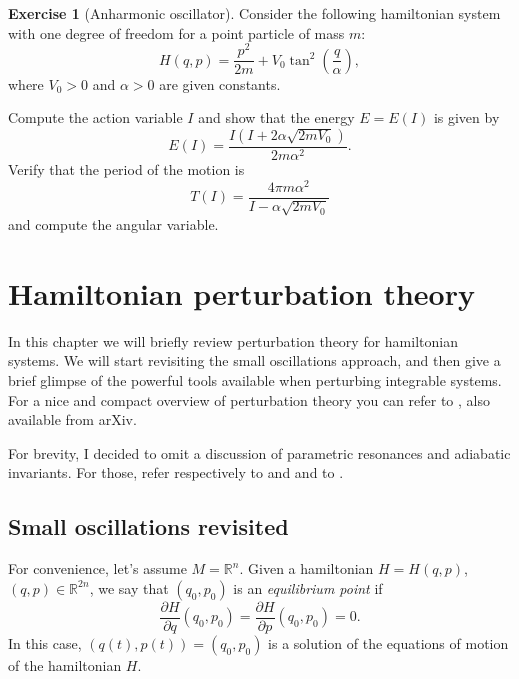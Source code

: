 \documentclass[english,fontsize=11pt,paper=b5]{scrbook}
\numberwithin{equation}{chapter}
\theoremstyle{definition}
\newtheorem{exercise}{Exercise}[chapter]
\begin{document}
      \begin{exercise}[Anharmonic oscillator]
        Consider the following hamiltonian system with one degree of freedom for a point particle of mass $m$:
        \begin{equation}
          H(q,p) = \frac{p^2}{2m} + V_0 \tan^2\left(\frac{q}{\alpha}\right),
        \end{equation}
        where $V_0>0$ and $\alpha>0$ are given constants.

        Compute the action variable $I$ and show that the energy $E = E(I)$ is given by
        \begin{equation}
          E(I) = \frac{I (I + 2\alpha\sqrt{2m V_0})}{2m\alpha^2}.
        \end{equation}
        Verify that the period of the motion is
        \begin{equation}
          T(I) = \frac{4 \pi m \alpha^2}{I - \alpha \sqrt{2mV_0}}
        \end{equation}
        and compute the angular variable.
      \end{exercise}


      \chapter{Hamiltonian perturbation theory}

      In this chapter we will briefly review perturbation theory for hamiltonian systems.
      We will start revisiting the small oscillations approach, and then give a brief glimpse of the powerful tools available when perturbing integrable systems.
      For a nice and compact overview of perturbation theory you can refer to \cite{Celletti_2009}, also available from arXiv.

      For brevity, I decided to omit a discussion of parametric resonances and adiabatic invariants.
      For those, refer respectively to \cite[Chapter 25]{book:arnold} and \cite[Chapter 5.4]{book:knauf} and to \cite[Chapter 15.1]{book:knauf}.

      \section{Small oscillations revisited}
      For convenience, let's assume $M=\mathbb{R}^n$.
      Given a hamiltonian $H=H(q,p)$, $(q,p)\in\mathbb{R}^{2n}$, we say that $(q_0, p_0)$ is an \emph{equilibrium point} if
      \begin{equation}
        \frac{\partial H}{\partial q}(q_0, p_0) = \frac{\partial H}{\partial p}(q_0, p_0) = 0.
      \end{equation}
      In this case, $(q(t), p(t)) = (q_0, p_0)$ is a solution of the equations of motion of the hamiltonian $H$.
\end{document}
